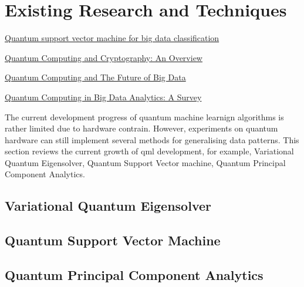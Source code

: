 \section{Existing Research and Techniques} \label{Sec: Existing Research and Techniques}

\begin{framed}
    \href{https://arxiv.org/pdf/1307.0471.pdf}{Quantum support vector machine for big data classification}

    \href{https://link.springer.com/chapter/10.1007/978-3-319-63639-9_4}{Quantum Computing and Cryptography: An Overview}

    \href{https://isg-one.com/articles/quantum-computing-and-the-future-of-big-data}{Quantum Computing and The Future of Big Data}

    \href{https://ieeexplore.ieee.org/document/7876324}{Quantum Computing in Big Data Analytics: A Survey}

\end{framed}

The current development progress of quantum machine learnign algorithms is rather limited due to hardware contrain.
However, experiments on quantum hardware can still implement several methods for generalising data patterns.
This section reviews the current growth of qml development, for example, Variational Quantum Eigensolver, Quantum Support Vector machine, Quantum Principal Component Analytics.

\subsection{Variational Quantum Eigensolver} \label{Sec: VQE}

\subsection{Quantum Support Vector Machine} \label{Sec: QSVM}

\subsection{Quantum Principal Component Analytics} \label{Sec: QPCA}
